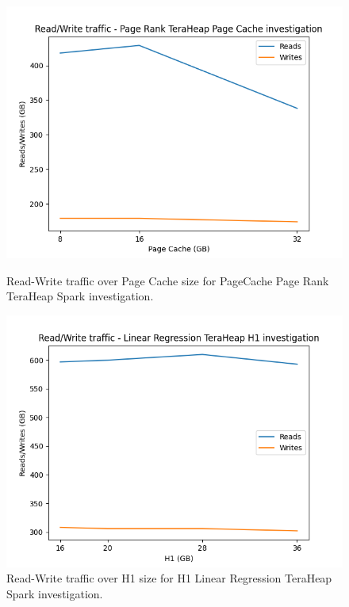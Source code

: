 \begin{figure}[thbp]
    \includegraphics[width=\linewidth]{./fig/rw_pr_pc_th.png}
    \caption{Read-Write traffic over Page Cache size for PageCache Page Rank
    TeraHeap Spark investigation.}
    \label{fig:rw_pr_pc_th}

    \includegraphics[width=\linewidth]{./fig/rw_linr_h1_th.png}
    \caption{Read-Write traffic over H1 size for H1 Linear Regression
    TeraHeap Spark investigation.}
    \label{fig:rw_linr_h1_th}
\end{figure}

